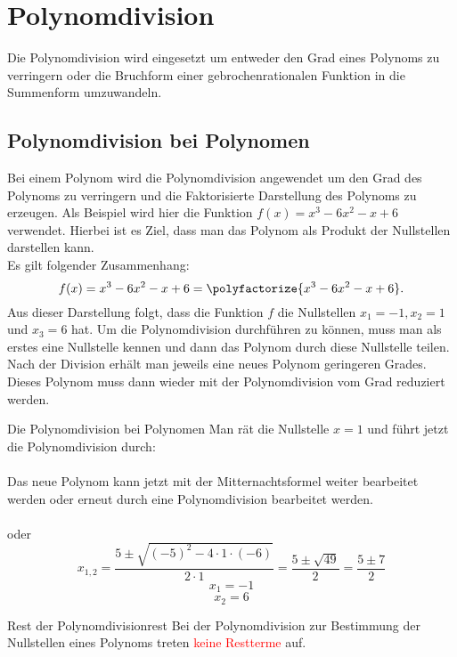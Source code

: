 \section{Polynomdivision}
Die Polynomdivision wird eingesetzt um entweder den Grad eines Polynoms zu verringern oder die Bruchform einer gebrochenrationalen Funktion in die Summenform umzuwandeln. 
\subsection{Polynomdivision bei Polynomen}\label{polynomdivision}

    Bei einem Polynom wird die Polynomdivision angewendet um den Grad des Polynoms zu verringern und die Faktorisierte Darstellung des Polynoms zu erzeugen. Als Beispiel wird hier die Funktion $f(x) = x^3-6x^2-x+6$ verwendet. Hierbei ist es Ziel, dass man das Polynom als Produkt der Nullstellen darstellen kann.\\
    Es gilt folgender Zusammenhang: $$f(x) = x^3-6x^2-x+6 =  \polyfactorize{x^3-6x^2-x+6}.$$ Aus dieser Darstellung folgt, dass die Funktion $f$ die Nullstellen $x_1 = -1, x_2 = 1$ und $x_3= 6$ hat. Um die Polynomdivision durchführen zu können, muss man als erstes eine Nullstelle kennen und dann das Polynom durch diese Nullstelle teilen. Nach der Division erhält man jeweils eine neues Polynom geringeren Grades. Dieses Polynom muss dann wieder mit der Polynomdivision vom Grad reduziert werden.
    \begin{bsp}{Die Polynomdivision bei Polynomen}{} 
Man rät die Nullstelle $x=1$ und führt jetzt die Polynomdivision durch:\\
 \\
 Das neue Polynom kann jetzt mit der Mitternachtsformel weiter bearbeitet werden oder erneut durch eine Polynomdivision bearbeitet werden. \\
  \\
  oder
  $$ x_{1,2} = \dfrac{5\pm \sqrt{(-5)^2 - 4\cdot 1 \cdot (-6)}}{2\cdot 1} = \dfrac{5 \pm \sqrt{49} }{2} = \dfrac{5\pm 7}{2}$$
 $$ x_1 = -1$$
 $$ x_2= 6$$
\begin{center}
\end{center}
\end{bsp}
\begin{b8d}{Rest der Polynomdivision}{rest}
  Bei der Polynomdivision zur Bestimmung der Nullstellen eines Polynoms treten \textcolor{red}{keine Restterme} auf.   
\end{b8d}
